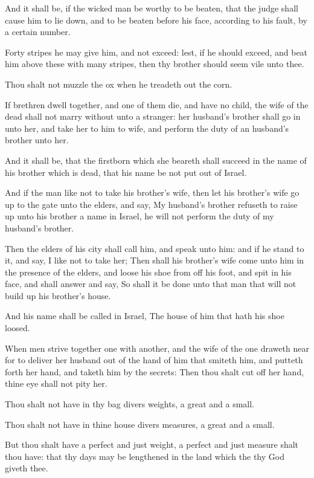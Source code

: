\Verse And it shall be, if the wicked man be worthy to be beaten, that the judge shall cause him to lie down, and to be beaten before his face, according to his fault, by a certain number.

\Verse Forty stripes he may give him, and not exceed: lest, if he should exceed, and beat him above these with many stripes, then thy brother should seem vile unto thee.

\Verse Thou shalt not muzzle the ox when he treadeth out the corn.

\Verse If brethren dwell together, and one of them die, and have no child, the wife of the dead shall not marry without unto a stranger: her husband's brother shall go in unto her, and take her to him to wife, and perform the duty of an husband's brother unto her.

\Verse And it shall be, that the firstborn which she beareth shall succeed in the name of his brother which is dead, that his name be not put out of Israel.

\Verse And if the man like not to take his brother's wife, then let his brother's wife go up to the gate unto the elders, and say, My husband's brother refuseth to raise up unto his brother a name in Israel, he will not perform the duty of my husband's brother.

\Verse Then the elders of his city shall call him, and speak unto him: and if he stand to it, and say, I like not to take her; \Verse Then shall his brother's wife come unto him in the presence of the elders, and loose his shoe from off his foot, and spit in his face, and shall answer and say, So shall it be done unto that man that will not build up his brother's house.

\Verse And his name shall be called in Israel, The house of him that hath his shoe loosed.

\Verse When men strive together one with another, and the wife of the one draweth near for to deliver her husband out of the hand of him that smiteth him, and putteth forth her hand, and taketh him by the secrets: \Verse Then thou shalt cut off her hand, thine eye shall not pity her.

\Verse Thou shalt not have in thy bag divers weights, a great and a small.

\Verse Thou shalt not have in thine house divers measures, a great and a small.

\Verse But thou shalt have a perfect and just weight, a perfect and just measure shalt thou have: that thy days may be lengthened in the land which the \LORD thy God giveth thee.

